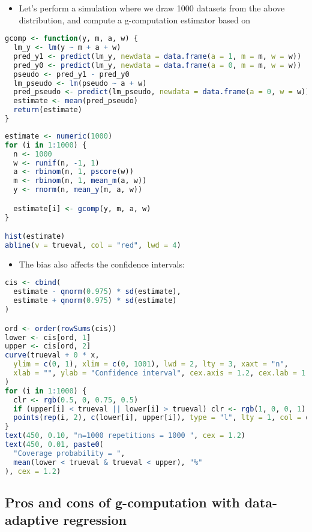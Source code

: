 \documentclass[
  12pt,
]{book}
\providecommand{\tightlist}{%
  \setlength{\itemsep}{0pt}\setlength{\parskip}{0pt}}
\theoremstyle{definition}
\theoremstyle{definition}
\theoremstyle{definition}
\newcommand{\1}{\mathbbm{1}}
\begin{document}
\begin{itemize}
\tightlist
\item
  Let's perform a simulation where we draw 1000 datasets from the above distribution, and compute a g-computation estimator based on
\end{itemize}

\begin{lstlisting}[language=R]
gcomp <- function(y, m, a, w) {
  lm_y <- lm(y ~ m + a + w)
  pred_y1 <- predict(lm_y, newdata = data.frame(a = 1, m = m, w = w))
  pred_y0 <- predict(lm_y, newdata = data.frame(a = 0, m = m, w = w))
  pseudo <- pred_y1 - pred_y0
  lm_pseudo <- lm(pseudo ~ a + w)
  pred_pseudo <- predict(lm_pseudo, newdata = data.frame(a = 0, w = w))
  estimate <- mean(pred_pseudo)
  return(estimate)
}
\end{lstlisting}

\begin{lstlisting}[language=R]
estimate <- numeric(1000)
for (i in 1:1000) {
  n <- 1000
  w <- runif(n, -1, 1)
  a <- rbinom(n, 1, pscore(w))
  m <- rbinom(n, 1, mean_m(a, w))
  y <- rnorm(n, mean_y(m, a, w))

  estimate[i] <- gcomp(y, m, a, w)
}

hist(estimate)
abline(v = trueval, col = "red", lwd = 4)
\end{lstlisting}

\begin{itemize}
\tightlist
\item
  The bias also affects the confidence intervals:
\end{itemize}

\begin{lstlisting}[language=R]
cis <- cbind(
  estimate - qnorm(0.975) * sd(estimate),
  estimate + qnorm(0.975) * sd(estimate)
)

ord <- order(rowSums(cis))
lower <- cis[ord, 1]
upper <- cis[ord, 2]
curve(trueval + 0 * x,
  ylim = c(0, 1), xlim = c(0, 1001), lwd = 2, lty = 3, xaxt = "n",
  xlab = "", ylab = "Confidence interval", cex.axis = 1.2, cex.lab = 1.2
)
for (i in 1:1000) {
  clr <- rgb(0.5, 0, 0.75, 0.5)
  if (upper[i] < trueval || lower[i] > trueval) clr <- rgb(1, 0, 0, 1)
  points(rep(i, 2), c(lower[i], upper[i]), type = "l", lty = 1, col = clr)
}
text(450, 0.10, "n=1000 repetitions = 1000 ", cex = 1.2)
text(450, 0.01, paste0(
  "Coverage probability = ",
  mean(lower < trueval & trueval < upper), "%"
), cex = 1.2)
\end{lstlisting}

\hypertarget{pros-and-cons-of-g-computation-with-data-adaptive-regression}{%
\subsection{Pros and cons of g-computation with data-adaptive regression}\label{pros-and-cons-of-g-computation-with-data-adaptive-regression}}
\end{document}
